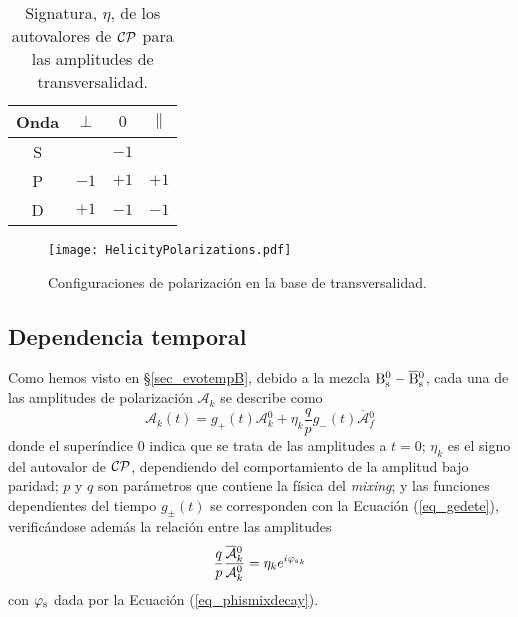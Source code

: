 \begin{table}[H]
\centering
\begin{tabular}{c|ccc} 
\toprule
Onda & $\perp$ & $0$ & $\parallel$\\ 
\midrule
S &      & $-1$ &       \\
P & $-1$ & $+1$ & $+1$  \\
D & $+1$ & $-1$ & $-1$  \\ 
\bottomrule
\end{tabular}
\caption{Signatura, $\eta$, de los autovalores de $\mathcal{CP}$ para las amplitudes de transversalidad.}	
\end{table}

\begin{figure}[H]
\centering
\texttt{[image: HelicityPolarizations.pdf]}
\caption{Configuraciones de polarización en la base de transversalidad.}
\end{figure}


\subsection{Dependencia temporal} %
\label{sec_tempdist}

Como hemos visto en \S \ref{sec_evotempB}, debido a la mezcla $\text{B}{}_{\text{s}}^{\text{0}}-\overline{\text{B}}{}_{\text{s}}^{\text{0}}$, cada una de las amplitudes de polarización $\mathcal{A}_k$ se describe como
\begin{equation}
\mathcal{A}_k(t) = g_+ (t) \mathcal{A}{}_k^0 + \eta_k \frac{q}{p} g_{-}(t) \overline{\mathcal{A}}{}_f^0
\end{equation}
donde el superíndice $0$ indica que se trata de las amplitudes a $t=0$; $\eta_k$ es el signo del autovalor de $\mathcal{CP}$, dependiendo del comportamiento de la amplitud bajo paridad; $p$ y $q$ son parámetros que contiene la física del \emph{mixing}; y las funciones dependientes del tiempo $g_{\pm}(t)$ se corresponden con la Ecuación (\ref{eq_gedete}), verificándose además la relación entre las amplitudes 
\begin{equation}
	\frac{q}{p} \frac{\overline{\mathcal{A}}{}_k^0}{\mathcal{A}{}_k^0} = \eta_k e^{i {\varphi_{\text{s}}}_k}
\end{equation}
con $\varphi_{\text{s}}$ dada por la Ecuación (\ref{eq_phismixdecay}).


